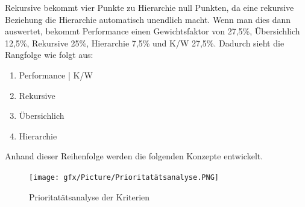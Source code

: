 Rekursive bekommt vier Punkte zu Hierarchie null Punkten, da eine rekursive Beziehung die Hierarchie automatisch unendlich macht.
\newline
\newline
Wenn man dies dann auswertet, bekommt Performance einen Gewichtsfaktor von 27,5\%, Übersichlich 12,5\%, Rekursive 25\%, Hierarchie 7,5\% und \ac{K/W} 27,5\%.
Dadurch sieht die Rangfolge wie folgt aus:
\begin{enumerate}
	\item Performance | \ac{K/W}
	\item Rekursive
	\item Übersichlich
	\item Hierarchie
\end{enumerate}
Anhand dieser Reihenfolge werden die folgenden Konzepte entwickelt.
\begin{figure}[h!]
 \centering
 \texttt{[image: gfx/Picture/Prioritatätsanalyse.PNG]}
 \caption{Prioritatätsanalyse der Kriterien}
 \label{fig:Prio}
\end{figure}

